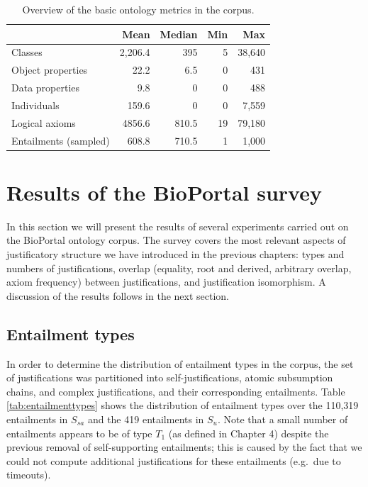 \begin{table}[htb]
\centering
\caption{Overview of the basic ontology metrics in the corpus.}
\label{tab:ontologies}
\begin{tabu}{lrrrr}
\toprule
& Mean & Median & Min & Max \\
\midrule
Classes &2,206.4 & 395 & 5 & 38,640 \\
Object properties & 22.2 & 6.5 & 0 & 431 \\
Data properties & 9.8 & 0 & 0 & 488 \\
Individuals & 159.6 & 0 & 0 & 7,559 \\
Logical axioms & 4856.6 & 810.5 & 19 & 79,180 \\
Entailments (sampled) &  608.8 & 710.5 & 1 & 1,000 \\
\bottomrule 
\end{tabu} 
\end{table}



\section{Results of the BioPortal survey}

In this section we will present the results of several experiments carried out on the BioPortal ontology corpus. The survey covers the most relevant aspects of justificatory structure we have introduced in the previous chapters: types and numbers of justifications, overlap (equality, root and derived, arbitrary overlap, axiom frequency) between justifications, and justification isomorphism. A discussion of the results follows in the next section.

\subsection{Entailment types}

In order to determine the distribution of entailment types in the corpus, the set of justifications was partitioned into self-justifications, atomic subsumption chains, and complex justifications, and their corresponding entailments. Table \ref{tab:entailmenttypes} shows the distribution of entailment types over the 110,319 entailments in $S_{sa}$ and the 419 entailments in $S_{u}$. Note that a small number of entailments appears to be of type $T_{1}$ (as defined in Chapter 4) despite the previous removal of self-supporting entailments; this is caused by the fact that we could not compute additional justifications for these entailments (e.g.\ due to timeouts).

